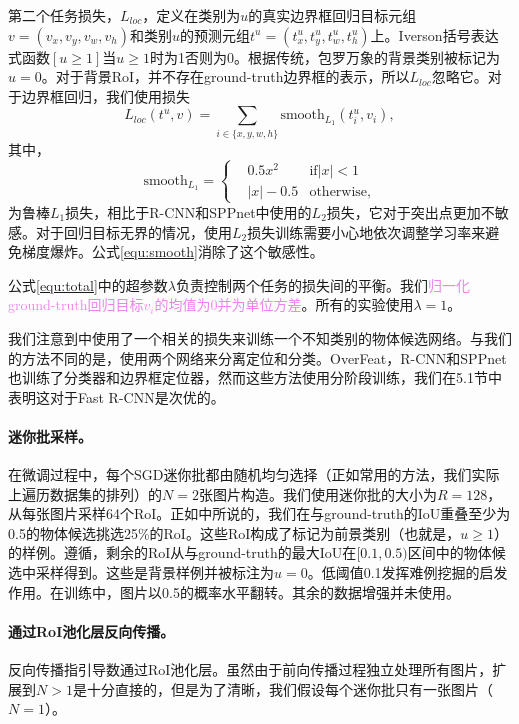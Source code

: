 \documentclass[../main]{subfile}
\begin{document}
第二个任务损失，$L_{loc}$，定义在类别为$u$的真实边界框回归目标元组$v=(v_x, v_y,v_w,v_h)$和类别$u$的预测元组$t^u=(t_x^u, t_y^u, t_w^u, t_h^u)$上。Iverson括号表达式函数$[u \ge 1]$当$u \ge1$时为1否则为0。根据传统，包罗万象的背景类别被标记为$u=0$。对于背景RoI，并不存在ground-truth边界框的表示，所以$L_{loc}$忽略它。对于边界框回归，我们使用损失
\begin{equation} \label{equ:loc}
    L_{loc}(t^u, v) = \sum_{i\in \{x, y,w,h\}}\text{smooth}_{L_1}(t_i^u, v_i),
\end{equation}
其中，
\begin{equation} \label{equ:smooth}
    \text{smooth}_{L_1} = \left\{
    \begin{aligned}
         & 0.5x^2    & \text{if} |x| < 1 \\
         & |x| - 0.5 & \text{otherwise,}
    \end{aligned}
    \right.
\end{equation}
为鲁棒$L_1$损失，相比于R-CNN和SPPnet中使用的$L_2$损失，它对于突出点更加不敏感。对于回归目标无界的情况，使用$L_2$损失训练需要小心地依次调整学习率来避免梯度爆炸。公式\ref{equ:smooth}消除了这个敏感性。

公式\ref{equ:total}中的超参数$\lambda$负责控制两个任务的损失间的平衡。我们\textcolor{violet}{归一化ground-truth回归目标$v_i$的均值为0并为单位方差}。所有的实验使用$\lambda=1$。

我们注意到\cite{6}中使用了一个相关的损失来训练一个不知类别的物体候选网络。与我们的方法不同的是，\cite{6}使用两个网络来分离定位和分类。OverFeat\cite{overfeat}，R-CNN\cite{rcnn}和SPPnet\cite{spp}也训练了分类器和边界框定位器，然而这些方法使用分阶段训练，我们在5.1节中表明这对于Fast R-CNN是次优的。

\paragraph{迷你批采样。}在微调过程中，每个SGD迷你批都由随机均匀选择（正如常用的方法，我们实际上遍历数据集的排列）的$N=2$张图片构造。我们使用迷你批的大小为$R=128$，从每张图片采样64个RoI。正如\cite{rcnn}中所说的，我们在与ground-truth的IoU重叠至少为0.5的物体候选挑选25\%的RoI。这些RoI构成了标记为前景类别（也就是，$u \ge 1$）的样例。遵循\cite{spp}，剩余的RoI从与ground-truth的最大IoU在$[0.1, 0.5)$区间中的物体候选中采样得到。这些是背景样例并被标注为$u=0$。低阈值0.1发挥难例挖掘的启发作用。在训练中，图片以0.5的概率水平翻转。其余的数据增强并未使用。

\paragraph{通过RoI池化层反向传播。}反向传播指引导数通过RoI池化层。虽然由于前向传播过程独立处理所有图片，扩展到$N>1$是十分直接的，但是为了清晰，我们假设每个迷你批只有一张图片（$N=1$）。
\end{document}
